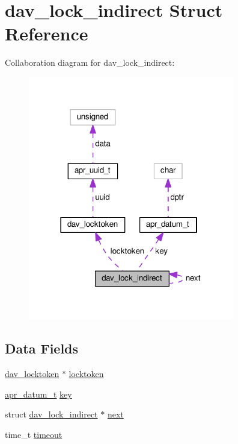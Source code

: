 \hypertarget{structdav__lock__indirect}{}\section{dav\+\_\+lock\+\_\+indirect Struct Reference}
\label{structdav__lock__indirect}


Collaboration diagram for dav\+\_\+lock\+\_\+indirect\+:
\nopagebreak
\begin{figure}[H]
\begin{center}
\leavevmode
\includegraphics[width=255pt]{structdav__lock__indirect__coll__graph}
\end{center}
\end{figure}
\subsection*{Data Fields}
\begin{DoxyCompactItemize}
\item 
\hyperlink{structdav__locktoken}{dav\+\_\+locktoken} $\ast$ \hyperlink{structdav__lock__indirect_a3f4cf8c52208ee225fbe681253e5532d}{locktoken}
\item 
\hyperlink{structapr__datum__t}{apr\+\_\+datum\+\_\+t} \hyperlink{structdav__lock__indirect_abf684cdfb59c80339403a61d4c2531ad}{key}
\item 
struct \hyperlink{structdav__lock__indirect}{dav\+\_\+lock\+\_\+indirect} $\ast$ \hyperlink{structdav__lock__indirect_afc97fa975666d34ae4a623e6f19bbad9}{next}
\item 
time\+\_\+t \hyperlink{structdav__lock__indirect_a9b9cee4033908cc1b16f33bd4b7223ed}{timeout}
\end{DoxyCompactItemize}


